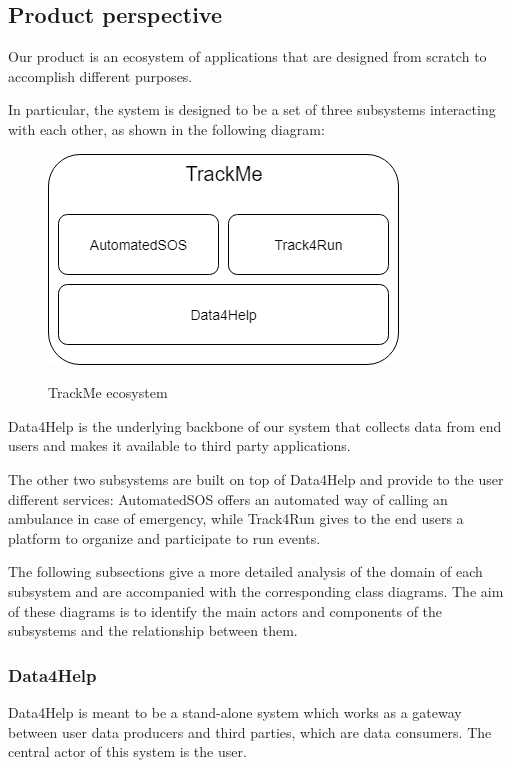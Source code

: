 \subsection{Product perspective}
Our product is an ecosystem of applications that are designed from scratch to accomplish different purposes.

In particular, the system is designed to be a set of three subsystems interacting with each other, as shown in the following diagram:

\begin{figure}[!ht]
	\centering
	\caption*{\blindtext}
	\includegraphics[scale = 0.70]{Images/general_structure.png}\\[1.0 cm]
	\caption{TrackMe ecosystem}
\end{figure}

Data4Help is the underlying backbone of our system that collects data from end users and makes it available to third party applications. 

The other two subsystems are built on top of Data4Help and provide to the user different services: AutomatedSOS offers an automated way of calling an ambulance in case of emergency, while Track4Run gives to the end users a platform to organize and participate to run events.

The following subsections give a more detailed analysis of the domain of each subsystem and are accompanied with the corresponding class diagrams. The aim of these diagrams is to identify the main actors and components of the subsystems and the relationship between them.

 \newpage
\subsubsection{Data4Help}
Data4Help is meant to be a stand-alone system which works as a gateway between user data producers and third parties, which are data consumers. The central actor of this system is the user.

